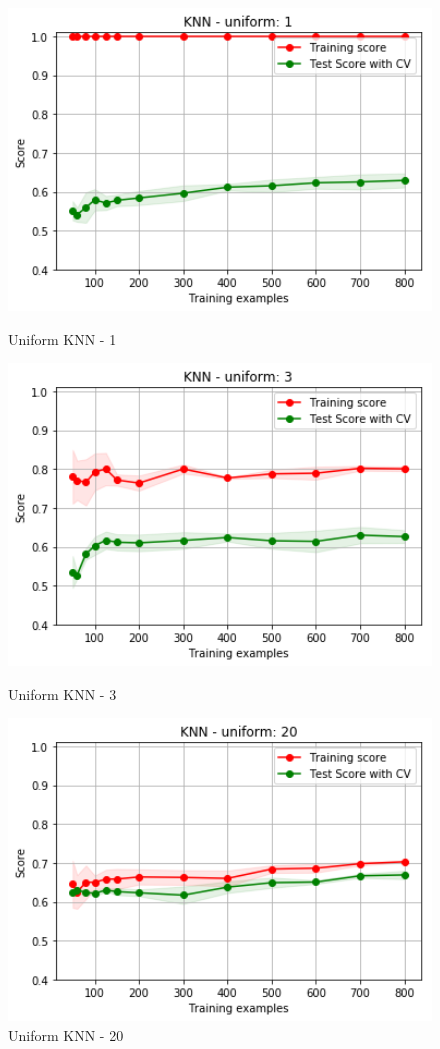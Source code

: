 \documentclass[h]{article}
\begin{document}
\begin{figure}[H]
      \includegraphics[width=1\textwidth,keepaspectratio]{2_knn_1_1.png} 
      \caption*{Uniform KNN - 1} 
   \endminipage\hfill
      \includegraphics[width=1\textwidth,keepaspectratio]{2_knn_3_1.png} 
      \caption*{Uniform KNN - 3} 
   \endminipage\hfill
      \includegraphics[width=1\textwidth,keepaspectratio]{2_knn_20_1.png} 
      \caption*{Uniform KNN - 20} 
   \endminipage\hfill
\end{figure}
\end{document}
